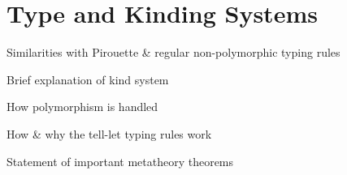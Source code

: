 \section{Type and Kinding Systems}
\label{sec:type-system}
\todo Similarities with Pirouette \& regular non-polymorphic typing rules

\todo Brief explanation of kind system

\todo How polymorphism is handled

\todo How \& why the tell-let typing rules work

\todo Statement of important metatheory theorems

